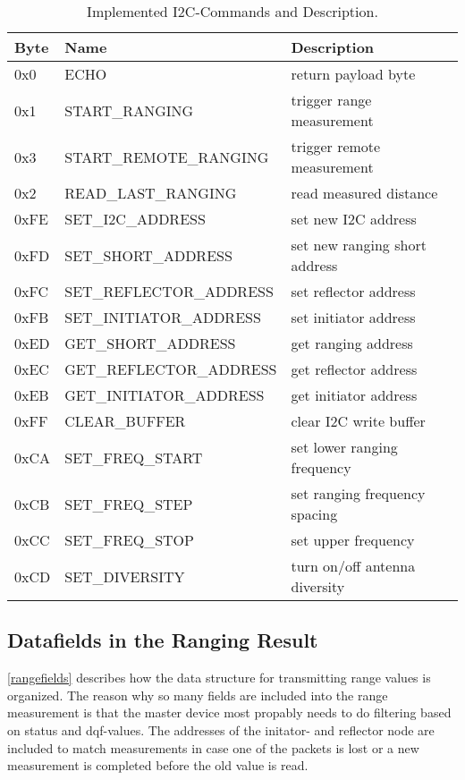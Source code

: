 \begin{table}
	
	\begin{tabularx}{\textwidth}{l | l | X}
	Byte & Name & Description \\ \hline
	0x0  & ECHO & return payload byte\\
	0x1  & START\_RANGING & trigger range measurement\\
	0x3  & START\_REMOTE\_RANGING & trigger remote measurement\\
	0x2  & READ\_LAST\_RANGING & read measured distance\\
	0xFE & SET\_I2C\_ADDRESS & set new I2C address\\
	0xFD & SET\_SHORT\_ADDRESS & set new ranging short address\\
	0xFC & SET\_REFLECTOR\_ADDRESS & set reflector address\\
	0xFB & SET\_INITIATOR\_ADDRESS & set initiator address\\
	0xED & GET\_SHORT\_ADDRESS & get ranging address\\
	0xEC & GET\_REFLECTOR\_ADDRESS & get reflector address\\
	0xEB & GET\_INITIATOR\_ADDRESS & get initiator address\\
	0xFF & CLEAR\_BUFFER & clear I2C write buffer\\
	0xCA & SET\_FREQ\_START & set lower ranging frequency\\
	0xCB & SET\_FREQ\_STEP & set ranging frequency spacing\\
	0xCC & SET\_FREQ\_STOP & set upper frequency\\
	0xCD & SET\_DIVERSITY & turn on/off antenna diversity\\
	\end{tabularx}

	\caption[Implemented I2C-Commands and Description]{Implemented I2C-Commands and Description.}
	\label{i2ccommands}
	
\end{table}

\subsection{Datafields in the Ranging Result}
\autoref{rangefields} describes how the data structure for transmitting range values is organized.
The reason why so many fields are included into the range measurement is that the master device most propably needs to do filtering based on status and dqf-values.
The addresses of the initator- and reflector node are included to match measurements in case one of the packets is lost or a new measurement is completed before the old value is read.

